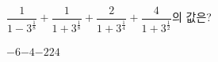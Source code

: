$\dfrac{1}{1-3^{\frac{1}{8}}}+\dfrac{1}{1+3^{\frac{1}{8}}}+\dfrac{2}{1+3^{\frac{1}{4}}}+\dfrac{4}{1+3^{\frac{1}{2}}}$의 값은?
\begin{choices32}{$-6$}{$-4$}{$-2$}{$2$}{$4$}\end{choices32}
